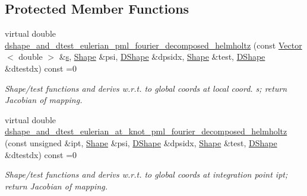 \subsection*{Protected Member Functions}
\begin{DoxyCompactItemize}
\item 
virtual double \hyperlink{classoomph_1_1PMLFourierDecomposedHelmholtzEquationsBase_ac00e3f75197b37ff99a343b88b36284f}{dshape\+\_\+and\+\_\+dtest\+\_\+eulerian\+\_\+pml\+\_\+fourier\+\_\+decomposed\+\_\+helmholtz} (const \hyperlink{classoomph_1_1Vector}{Vector}$<$ double $>$ \&\hyperlink{cfortran_8h_ab7123126e4885ef647dd9c6e3807a21c}{s}, \hyperlink{classoomph_1_1Shape}{Shape} \&psi, \hyperlink{classoomph_1_1DShape}{D\+Shape} \&dpsidx, \hyperlink{classoomph_1_1Shape}{Shape} \&test, \hyperlink{classoomph_1_1DShape}{D\+Shape} \&dtestdx) const =0
\begin{DoxyCompactList}\small\item\em Shape/test functions and derivs w.\+r.\+t. to global coords at local coord. s; return Jacobian of mapping. \end{DoxyCompactList}\item 
virtual double \hyperlink{classoomph_1_1PMLFourierDecomposedHelmholtzEquationsBase_a517cd98df2fee78db1cbdfe8fc8666e9}{dshape\+\_\+and\+\_\+dtest\+\_\+eulerian\+\_\+at\+\_\+knot\+\_\+pml\+\_\+fourier\+\_\+decomposed\+\_\+helmholtz} (const unsigned \&ipt, \hyperlink{classoomph_1_1Shape}{Shape} \&psi, \hyperlink{classoomph_1_1DShape}{D\+Shape} \&dpsidx, \hyperlink{classoomph_1_1Shape}{Shape} \&test, \hyperlink{classoomph_1_1DShape}{D\+Shape} \&dtestdx) const =0
\begin{DoxyCompactList}\small\item\em Shape/test functions and derivs w.\+r.\+t. to global coords at integration point ipt; return Jacobian of mapping. \end{DoxyCompactList}\end{DoxyCompactItemize}
